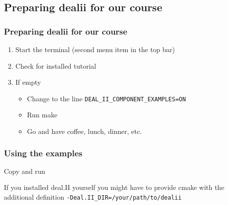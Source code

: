 \subsection{Preparing dealii for our course}
\begin{frame}
  \frametitle{Preparing dealii for our course}
  \begin{enumerate}
  \item Start the terminal (second menu item in the top bar)
  \item Check for installed tutorial
    \begin{block}{}
      
    \end{block}
  \item If empty
    \begin{block}{}
      
    \end{block}
    \begin{itemize}
    \item Change to the line \lstinline{DEAL_II_COMPONENT_EXAMPLES=ON}
    \item Run make
    \item Go and have coffee, lunch, dinner, etc.
    \end{itemize}
  \end{enumerate}
\end{frame}

\begin{frame}
  \frametitle{Using the examples}
    \begin{block}{Copy and run}
      
    \end{block}
    If you installed deal.II yourself you might have to provide cmake with the additional definition \lstinline{-Deal.II_DIR=/your/path/to/dealii}
\end{frame}

%       

